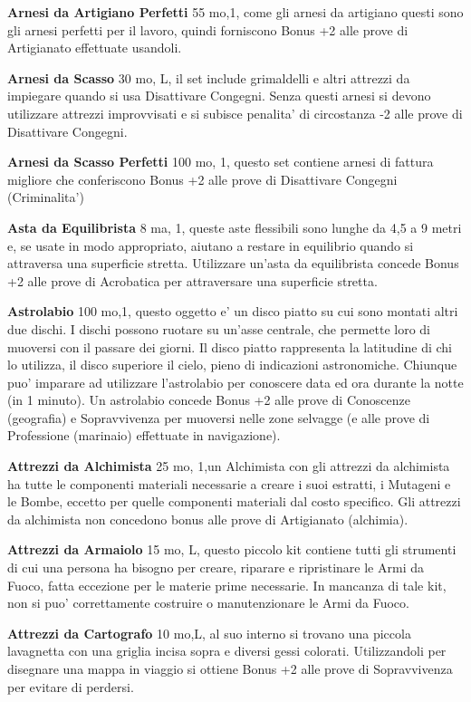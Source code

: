 \documentclass[a4paper,11pt,twoside,openany]{book}
\begin{document}
{		\textbf{Arnesi da Artigiano Perfetti} 55 mo,1, come gli arnesi da artigiano questi sono gli arnesi perfetti per il lavoro, quindi forniscono Bonus +2 alle prove di Artigianato effettuate usandoli.
		
		\textbf{Arnesi da Scasso} 30 mo, L, il set include grimaldelli e altri attrezzi da impiegare quando si usa Disattivare Congegni. Senza questi arnesi si devono utilizzare attrezzi improvvisati e si subisce penalita' di circostanza -2 alle prove di Disattivare Congegni.
		
		\textbf{Arnesi da Scasso Perfetti} 100 mo, 1, questo set contiene arnesi di fattura migliore che conferiscono Bonus +2 alle prove di Disattivare Congegni (Criminalita')
		
		\textbf{Asta da Equilibrista} 8 ma, 1, queste aste flessibili sono lunghe da 4,5 a 9 metri e, se usate in modo appropriato, aiutano a restare in equilibrio quando si attraversa una superficie stretta. Utilizzare un'asta da equilibrista concede Bonus +2 alle prove di Acrobatica per attraversare una superficie stretta.
		
		\textbf{Astrolabio} 100 mo,1,  questo oggetto e' un disco piatto su cui sono montati altri due dischi. I dischi possono ruotare su un'asse centrale, che permette loro di muoversi con il passare dei giorni. Il disco piatto rappresenta la latitudine di chi lo utilizza, il disco superiore il cielo, pieno di indicazioni astronomiche.
		Chiunque puo' imparare ad utilizzare l'astrolabio per conoscere data ed ora durante la notte (in 1 minuto). Un astrolabio concede Bonus +2 alle prove di Conoscenze (geografia) e Sopravvivenza per muoversi nelle zone selvagge (e alle prove di Professione (marinaio) effettuate in navigazione).
		
		\textbf{Attrezzi da Alchimista} 25 mo, 1,un Alchimista con gli attrezzi da alchimista ha tutte le componenti materiali necessarie a creare i suoi estratti, i Mutageni e le Bombe, eccetto per quelle componenti materiali dal costo specifico. Gli attrezzi da alchimista non concedono bonus alle prove di Artigianato (alchimia).
		
		\textbf{Attrezzi da Armaiolo} 15 mo, L, questo piccolo kit contiene tutti gli strumenti di cui una persona ha bisogno per creare, riparare e ripristinare le Armi da Fuoco, fatta eccezione per le materie prime necessarie. In mancanza di tale kit, non si puo' correttamente costruire o manutenzionare le Armi da Fuoco.
		
		\textbf{Attrezzi da Cartografo} 10 mo,L, al suo interno si trovano una piccola lavagnetta con una griglia incisa sopra e diversi gessi colorati. Utilizzandoli per disegnare una mappa in viaggio si ottiene Bonus +2 alle prove di Sopravvivenza per evitare di perdersi.
		
}
\end{document}
